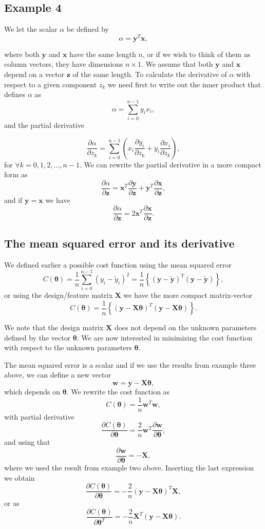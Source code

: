\documentclass[%
oneside,                 %
final,                   %
10pt]{article}
\begin{document}
\subsection*{Example 4}

We let the scalar $\alpha$ be defined by
\[
\alpha = \bm{y}^T\bm{x},
\]

where both $\bm{y}$ and $\bm{x}$ have the same length $n$, or if we
wish to think of them as column vectors, they have dimensions $n\times
1$. We assume that both $\bm{y}$ and $\bm{x}$ depend on a vector
$\bm{z}$ of the same length. To calculate the derivative of $\alpha$
with respect to a given component $z_k$ we need first to write out the
inner product that defines $\alpha$ as
\[
\alpha  = \sum_{i=0}^{n-1}y_ix_i,
\]
and the partial derivative

\[
\frac{\partial \alpha}{\partial z_k}  = \sum_{i=0}^{n-1}\left(x_i\frac{\partial y_i}{\partial z_k}+y_i\frac{\partial x_i}{\partial z_k}\right),
\]
for $\forall k =0,1,2,\dots,n-1$. We can rewrite the partial derivative in a more compact form as
\[
\frac{\partial \alpha}{\partial \bm{z}}  = \bm{x}^T\frac{\partial \bm{y}}{\partial \bm{z}}+\bm{y}^T\frac{\partial \bm{x}}{\partial \bm{z}},
\]
and if $\bm{y}=\bm{x}$ we have
\[
\frac{\partial \alpha}{\partial \bm{z}}  = 2\bm{x}^T\frac{\partial \bm{x}}{\partial \bm{z}}.
\]

\subsection*{The mean squared error and its derivative}

We defined earlier a possible cost function using the mean squared error
\[
C(\bm{\theta})=\frac{1}{n}\sum_{i=0}^{n-1}\left(y_i-\tilde{y}_i\right)^2=\frac{1}{n}\left\{\left(\bm{y}-\bm{\tilde{y}}\right)^T\left(\bm{y}-\bm{\tilde{y}}\right)\right\},
\]
or using the design/feature matrix $\bm{X}$ we have the more compact matrix-vector
\[
C(\bm{\theta})=\frac{1}{n}\left\{\left(\bm{y}-\bm{X}\bm{\theta}\right)^T\left(\bm{y}-\bm{X}\bm{\theta}\right)\right\}.
\]

We note that the design matrix $\bm{X}$ does not depend on the unknown parameters defined by the vector $\bm{\theta}$.
We are now interested in minimizing the cost function with respect to the unknown parameters $\bm{\theta}$.

The mean squared error is a scalar and if we use the results from example three above, we can define a new vector
\[
\bm{w}=\bm{y}-\bm{X}\bm{\theta},
\]
which depends on $\bm{\theta}$. We rewrite the cost function as
\[
C(\bm{\theta})=\frac{1}{n}\bm{w}^T\bm{w},
\]
with partial derivative
\[
\frac{\partial C(\bm{\theta})}{\partial \bm{\theta}}=\frac{2}{n}\bm{w}^T\frac{\partial \bm{w}}{\partial \bm{\theta}},
\]
and using that
\[
\frac{\partial \bm{w}}{\partial \bm{\theta}}=-\bm{X},
\]
where we used the result from example two above. Inserting the last expression we obtain
\[
\frac{\partial C(\bm{\theta})}{\partial \bm{\theta}}=-\frac{2}{n}\left(\bm{y}-\bm{X}\bm{\theta}\right)^T\bm{X},
\]
or as
\[
\frac{\partial C(\bm{\theta})}{\partial \bm{\theta}^T}=-\frac{2}{n}\bm{X}^T\left(\bm{y}-\bm{X}\bm{\theta}\right).
\]
\end{document}
